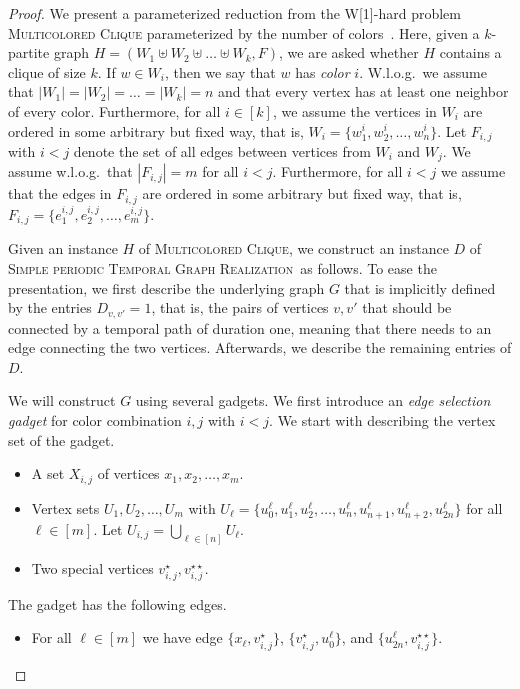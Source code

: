 \documentclass[11pt,a4paper]{article}
\theoremstyle{remark}
\theoremstyle{definition}
\newcommand{\deltaExactLong}{\textsc{Simple periodic Temporal Graph Realization}}
\begin{document}
\begin{proof}
    We present a parameterized reduction from the W[1]-hard problem \textsc{Multicolored Clique} parameterized by the number of colors~\cite{fellows2009multipleinterval}.  Here, given a $k$-partite graph $H=(W_1\uplus W_2 \uplus\ldots\uplus W_k, F)$, we are asked whether $H$ contains a clique of size $k$. If $w\in W_i$, then we say that $w$ has \emph{color} $i$. W.l.o.g.\ we assume that $|W_1|=|W_2|=\ldots=|W_k|=n$ and that every vertex has at least one neighbor of every color. 
    Furthermore, for all $i\in[k]$, we assume the vertices in $W_i$ are ordered in some arbitrary but fixed way, that is, $W_i=\{w^i_1,w^i_2,\ldots,w^i_n\}$.
    Let $F_{i,j}$ with $i<j$ denote the set of all edges between vertices from $W_i$ and $W_j$. We assume w.l.o.g.\ that $|F_{i,j}|=m$ for all $i< j$.
    Furthermore, for all $i<j$ we assume that the edges in $F_{i,j}$ are ordered in some arbitrary but fixed way, that is, $F_{i,j}=\{e^{i,j}_1,e^{i,j}_2,\ldots,e^{i,j}_m\}$.

    Given an instance $H$ of \textsc{Multicolored Clique}, we construct an instance $D$ of \deltaExactLong\ as follows. To ease the presentation, we first describe the underlying graph $G$ that is implicitly defined by the entries $D_{v,v'}=1$, that is, the pairs of vertices $v,v'$ that should be connected by a temporal path of duration one, meaning that there needs to an edge connecting the two vertices. Afterwards, we describe the remaining entries of $D$.

    We will construct $G$ using several gadgets. We first introduce an \emph{edge selection gadget} for color combination $i,j$ with $i<j$. We start with describing the vertex set of the gadget.
    \begin{itemize}
        \item A set $X_{i,j}$ of vertices $x_1, x_2, \ldots, x_m$.
        \item Vertex sets $U_1, U_2, \ldots, U_m$ with $U_\ell=\{u^\ell_0, u^\ell_1, u^\ell_2,\ldots, u^\ell_n, u^\ell_{n+1}, u^\ell_{n+2}, u^\ell_{2n}\}$ for all $\ell\in[m]$. Let $U_{i,j}=\bigcup_{\ell\in[n]} U_\ell$.
        \item Two special vertices $v_{i,j}^\star,v_{i,j}^{\star\star}$.
    \end{itemize}
    The gadget has the following edges.
    \begin{itemize}
        \item For all $\ell\in [m]$ we have edge $\{x_\ell,v_{i,j}^\star\}$, $\{v_{i,j}^\star,u^\ell_0\}$, and $\{u^\ell_{2n},v_{i,j}^{\star\star}\}$. 


\end{itemize}
\end{proof}
\end{document}
